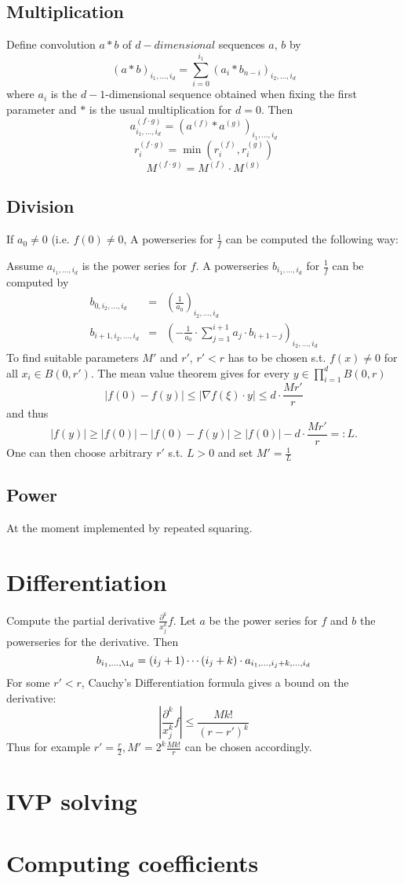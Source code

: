 \documentclass[]{article}
\newcommand{\abs}[1]{\left|#1\right|}
\begin{document}
\subsection{Multiplication}
Define convolution $a * b$ of $d-dimensional$ sequences $a$, $b$ by 
$$ (a * b)_{i_1, \dots, i_d} = \sum_{i=0}^{i_1} (a_i * b_{n-i})_{i_2, \dots, i_d} $$
where $a_i$ is the $d-1$-dimensional sequence obtained when fixing the first parameter and $*$ is the usual multiplication for $d=0$.
Then
$$a^{(f \cdot g)}_{i_1,\dots,i_d} = (a^{(f)}*a^{(g)})_{i_1, \dots, i_d}$$
$$r_i^{(f \cdot g)} = \min(r_i^{(f)}, r_i^{(g)}) $$
$$M^{(f \cdot g)} = M^{(f)} \cdot M^{(g)}$$
\subsection{Division}
If $a_0 \neq 0$ (i.e. $f(0) \neq 0$, A powerseries for $\frac{1}{f}$ can be computed the following way:

Assume $a_{i_1,\dots, i_d}$ is the power series for $f$. 
A powerseries $b_{i_1,\dots, i_d}$ for $\frac{1}{f}$ can be computed by
\begin{eqnarray*}
b_{0, i_2, \dots, i_d} &=& \left(\frac{1}{a_0}\right)_{i_2, \dots, i_d} \\
b_{i+1, i_2, \dots, i_d} &=& \left( -\frac{1}{a_0} \cdot \sum_{j=1}^{i+1}a_j \cdot b_{i+1-j}\right)_{i_2,\dots,i_d}
\end{eqnarray*}
To find suitable parameters $M'$ and $r'$, $r'<r$ has to be chosen s.t. $f(x) \neq 0$ for all $x_i \in B(0, r')$. 
The mean value theorem gives for every $y \in \prod_{i=1}^d B(0, r)$
$$ \abs{f(0)-f(y)} \leq \abs{\nabla f(\xi) \cdot y} \leq d \cdot \frac{Mr'}{r}$$
and thus
\begin{equation*}\label{divlowerbound}
\abs{f(y)} \geq \abs{f(0)}-\abs{f(0)-f(y)} \geq \abs{f(0)}-d\cdot \frac{Mr'}{r} =: L.
\end{equation*}
One can then choose arbitrary $r'$ s.t. $L > 0$ and set $M' = \frac{1}{L}$
\subsection{Power}
At the moment implemented by repeated squaring.
\section{Differentiation}
Compute the partial derivative $\frac{\partial^k}{x_j^k}f$.
Let $a$ be the power series for $f$ and $b$ the powerseries for the derivative.
Then
$$ b_{i_1,\dots, \i_d} = (i_j+1) \cdots (i_j+k) \cdot a_{i_1, \dots, i_j+k, \dots, i_d} $$
For some $r' < r$, Cauchy's Differentiation formula gives a bound on the derivative:
$$\abs{\frac{\partial^k}{x_j^k}f} \leq \frac{Mk!}{(r-r')^k}$$
Thus for example $r'=\frac{r}{2}, M'=2^k\frac{Mk!}{r}$ can be chosen accordingly.
\section{IVP solving}
\section{Computing coefficients}
\end{document}
